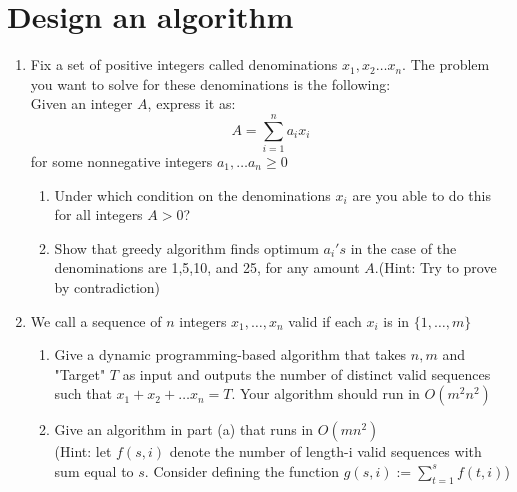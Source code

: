 \documentclass{article}
\begin{document}
\section{Design an algorithm }
\doublespacing
\begin{enumerate}
    \item Fix a set of positive integers called denominations $x_1,x_2 \dots x_n$. The problem you want to solve for these denominations is the following: \\
    Given an integer $A$, express it as:
    $$A=\sum_{i=1}^{n}a_ix_i$$
    for some nonnegative integers $a_1,\dots a_n \geq 0$
    \begin{enumerate}
        \item Under which condition on the denominations $x_i$ are you able to do this for all integers $A>0$?
        \newpage

        \item  Show that greedy algorithm finds optimum $a_i's $ in the case of the denominations are 1,5,10, and 25, for any amount $A$.(Hint: Try to prove by contradiction)
        \newpage
    \end{enumerate}
    \item We call a sequence of $n$ integers $x_1,\dots, x_n$ valid if each $x_i$ is in $\{1,\dots ,m\}$
    \begin{enumerate}
        \item Give a dynamic programming-based algorithm that takes $n,m$ and "Target" $T$ as input and outputs the number of distinct valid sequences such that $x_1+x_2+\dots x_n=T$. Your algorithm should run in $O(m^2n^2)$
        \newpage
        \item Give an algorithm in part (a) that runs in $O(mn^2)$\\
        (Hint: let $f(s, i)$ denote the number of length-i valid sequences with sum equal to $s$. Consider defining the function $g(s,i):=\sum_{t=1}^{s}f(t,i)$)
        \newpage
        \end{enumerate}
\end{enumerate}
\end{document}

